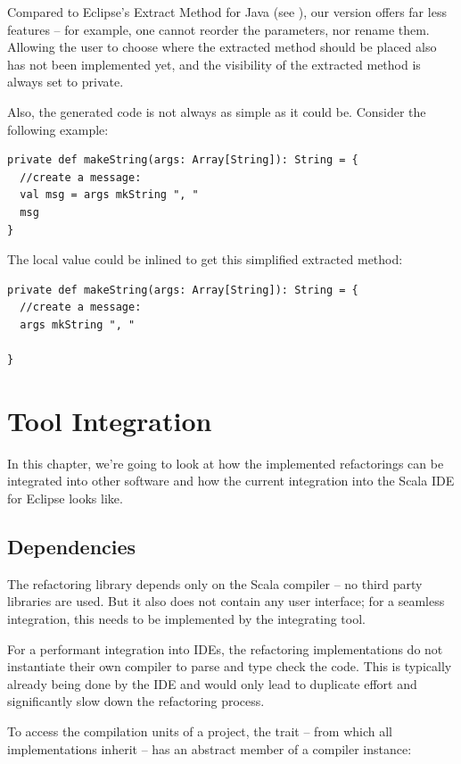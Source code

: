 \documentclass[10pt,a4paper,oneside]{scrreprt}
\begin{document}
Compared to Eclipse's Extract Method for Java (see ), our version offers far less features -- for example, one cannot reorder the parameters, nor rename them. Allowing the user to choose where the extracted method should be placed also has not been implemented yet, and the visibility of the extracted method is always set to private.

Also, the generated code is not always as simple as it could be. Consider the following example:

\begin{lstlisting}
private def makeString(args: Array[String]): String = {
  //create a message:
  val msg = args mkString ", "
  msg
}
\end{lstlisting}

The local value  could be inlined to get this simplified extracted method:

\begin{lstlisting}
private def makeString(args: Array[String]): String = {
  //create a message:
  args mkString ", "

}
\end{lstlisting}

\chapter{Tool Integration} \label{chapter:tool-integration}

In this chapter, we're going to look at how the implemented refactorings can be integrated into other software and how the current integration into the Scala IDE for Eclipse looks like.

\section{Dependencies}

The refactoring library depends only on the Scala compiler -- no third party libraries are used. But it also does not contain any user interface; for a seamless integration, this needs to be implemented by the integrating tool.

For a performant integration into IDEs, the refactoring implementations do not instantiate their own compiler to parse and type check the code. This is typically already being done by the IDE and would only lead to duplicate effort and significantly slow down the refactoring process.

To access the compilation units of a project, the  trait -- from which all implementations inherit -- has an abstract member of a compiler instance:
\end{document}
